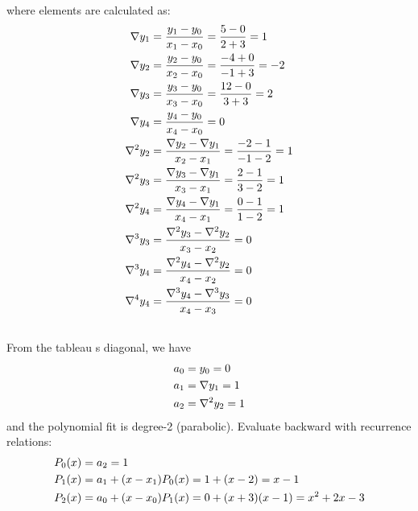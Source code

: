 \begin{exercise}{2}
where elements are calculated as:\\
\begin{align}
\notag
\nabla y_1 &= \frac{y_1-y_0}{x_1-x_0}=\frac{5-0}{2+3}=1\\
\notag
\nabla y_2 &= \frac{y_2-y_0}{x_2-x_0}=\frac{-4+0}{-1+3}=-2\\
\notag
\nabla y_3 &= \frac{y_3-y_0}{x_3-x_0}=\frac{12-0}{3+3}=2\\
\notag
\nabla y_4 &= \frac{y_4-y_0}{x_4-x_0}=0\\
\notag
\nabla ^2 y_2 &= \frac{\nabla y_2-\nabla y_1}{x_2-x_1}=\frac{-2-1}{-1-2}=1\\
\notag
\nabla ^2 y_3 &= \frac{\nabla y_3-\nabla y_1}{x_3-x_1}=\frac{2-1}{3-2}=1\\
\notag
\nabla ^2 y_4 &= \frac{\nabla y_4-\nabla y_1}{x_4-x_1}=\frac{0-1}{1-2}=1\\
\notag
\nabla ^3 y_3 &= \frac{\nabla ^2 y_3-\nabla ^2 y_2}{x_3-x_2}=0\\
\notag
\nabla ^3 y_4 &= \frac{\nabla ^2 y_4-\nabla ^2 y_2}{x_4-x_2}=0\\
\notag
\nabla ^4 y_4 &= \frac{\nabla ^3 y_4-\nabla ^3 y_3}{x_4-x_3}=0\\
\notag
\end{align}
From the tableau \textquotesingle s diagonal, we have\\
\begin{align}
\notag
a_0&=y_0=0\\
\notag
a_1&=\nabla y_1=1\\
\notag
a_2&=\nabla ^2 y_2=1
\end{align}
and the polynomial fit is degree-2 (parabolic).
Evaluate backward with recurrence relations:
\begin{align}
\notag
P_0(x) &= a_2 = 1\\
\notag
P_1(x) &= a_1 + (x-x_1)P_0(x) = 1 + (x-2) = x-1\\
\notag
P_2(x) &= a_0 + (x-x_0)P_1(x) = 0 + (x+3)(x-1) = x^2+2x-3\\
\notag
\end{align}
\end{exercise}

